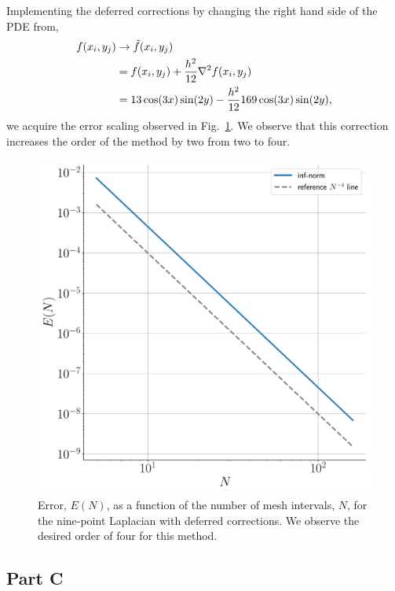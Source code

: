 \documentclass[12pt]{article}
\begin{document}
\FloatBarrier

Implementing the deferred corrections by changing the right hand side of the PDE from,
\begin{subequations}
	\begin{align}
		f(x_{i},y_{j})&\to \tilde{f}(x_{i},y_{j})\\
		&= f(x_{i},y_{j}) + \dfrac{h^{2}}{12}\laplacian{f(x_{i},y_{j})}\\
		&= 13\cos(3x)\sin(2y) - \dfrac{h^{2}}{12}169\cos(3x)\sin(2y),
	\end{align}
\end{subequations}
we acquire the error scaling observed in Fig.~\ref{fig:nine_pt_deferred_err_scaling}. We observe that this correction increases the order of the method by two from two to four. 

\begin{figure}[!h]
	\centering
	\includegraphics[clip,scale=0.4]{q2b_deferred_err_fig.pdf}
	\caption{Error, $E(N)$, as a function of the number of mesh intervals, $N$, for the nine-point Laplacian with deferred corrections. We observe the desired order of four for this method.}
	\label{fig:nine_pt_deferred_err_scaling}
\end{figure}

\subsection*{Part C}
\end{document}
